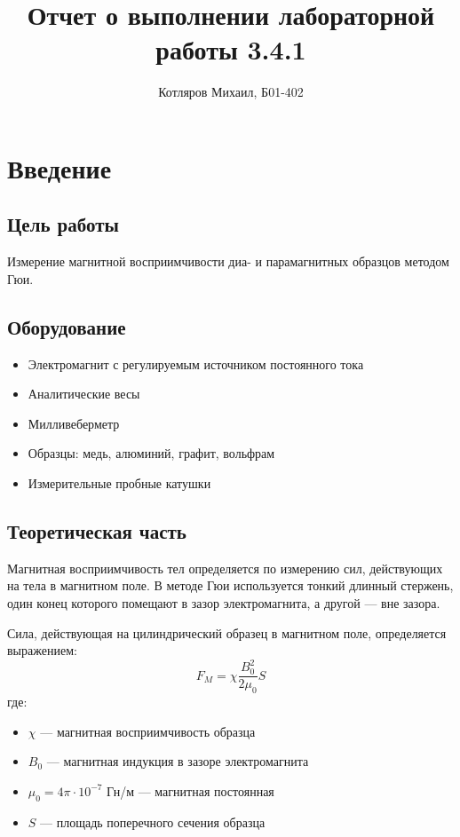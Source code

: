 \documentclass[a4paper]{article}
\title{\textbf{Отчет о выполнении лабораторной работы 3.4.1}}
\date{}
\author{Котляров Михаил, Б01-402}
\begin{document}
\maketitle
	
\section*{Введение}

\subsection*{Цель работы}
Измерение магнитной восприимчивости диа- и парамагнитных образцов методом Гюи.

\subsection*{Оборудование}
\begin{itemize}
    \item Электромагнит с регулируемым источником постоянного тока
    \item Аналитические весы
    \item Милливеберметр
    \item Образцы: медь, алюминий, графит, вольфрам
    \item Измерительные пробные катушки
\end{itemize}

\subsection*{Теоретическая часть}
Магнитная восприимчивость тел определяется по измерению сил, действующих на тела в магнитном поле. В методе Гюи используется тонкий длинный стержень, один конец которого помещают в зазор электромагнита, а другой --- вне зазора.

Сила, действующая на цилиндрический образец в магнитном поле, определяется выражением:
\[
F_M = \chi \frac{B_0^2}{2\mu_0} S
\]
где:
\begin{itemize}
    \item $\chi$ --- магнитная восприимчивость образца
    \item $B_0$ --- магнитная индукция в зазоре электромагнита
    \item $\mu_0 = 4\pi \cdot 10^{-7}$ Гн/м --- магнитная постоянная
    \item $S$ --- площадь поперечного сечения образца
\end{itemize}
\end{document}
